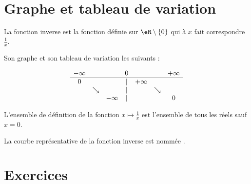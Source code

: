 
\section{Graphe et tableau de variation}

La fonction inverse est la fonction définie sur \( \eR\setminus\{ 0 \}\) qui à \( x\) fait correspondre \( \frac{1}{ x }\).

Son graphe et son tableau de variation les suivants : 
\begin{multicols}{2}

\begin{equation*}
    \begin{array}[]{ccccccc}
        -\infty&&&0&&&+\infty\\
        \hline
        0&&&|&+\infty&&\\
        &\searrow&&|&&\searrow&\\
        &&-\infty&|&&&0\\
    \end{array}
\end{equation*}

\columnbreak

\begin{center}

\end{center}
\end{multicols}

L'ensemble de définition de la fonction \( x\mapsto \frac{1}{ x }\) est l'ensemble de tous les réels sauf \( x=0\).

\begin{definition}
    La courbe représentative de la fonction inverse est nommée .
\end{definition}

\section{Exercices}


